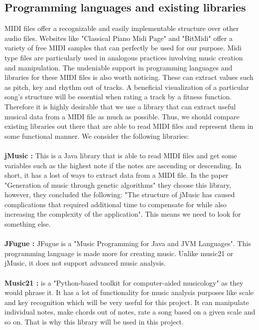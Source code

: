 \documentclass[a4paper]{article}
\begin{document}
\subsection{Programming languages and existing libraries}
MIDI files offer a recognizable and easily implementable structure over other audio files. Websites like "Classical Piano Midi Page" \cite{piano_midi} and "BitMidi" \cite{BitMidi} offer a variety of free MIDI samples that can perfectly be used for our purpose. Midi type files are particularly used in analogous practices involving music creation and manipulation. The undeniable support in programming languages and libraries for these MIDI files is also worth noticing. These can extract values such as pitch, key and rhythm out of tracks. A beneficial visualization of a particular song's structure will be essential when rating a track by a fitness function. Therefore it is highly desirable that we use a library that can extract useful musical data from a MIDI file as much as possible. Thus, we should compare existing libraries out there that are able to read MIDI files and represent them in some functional manner. We consider the following libraries:
\\\\    
\textbf{jMusic \cite{jmusic}:} This is a Java library that is able to read MIDI files and get some variables such as the highest note if the notes are ascending or descending. In short, it has a lost of ways to extract data from a MIDI file. In the paper "Generation of music through genetic algorithms" they choose this library, however, they concluded the following: "The structure of jMusic has caused complications that required additional time to compensate for while also increasing the complexity of the application". This means we need to look for something else.
\\\\
\textbf{JFugue \cite{jfugue}:} JFugue is a "Music Programming for Java and JVM Languages". This programming language is made more for creating music. Unlike music21 or jMusic, it does not support advanced music analysis.
\\\\
\textbf{Music21 \cite{music21}:} is a "Python-based toolkit for computer-aided musicology" as they would phrase it. It has a lot of functionality for music analysis purposes like scale and key recognition which will be very useful for this project. It can manipulate individual notes, make chords out of notes, rate a song based on a given scale and so on. That is why this library will be used in this project.
\end{document}
